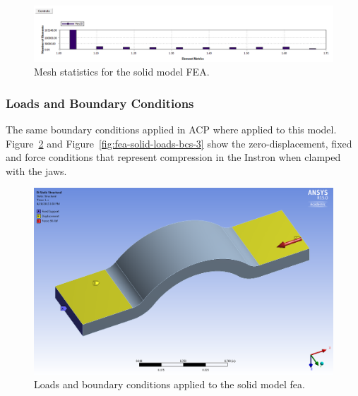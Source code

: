 \begin{figure}[htp]
\centering
\includegraphics[width=1\textwidth]{./figures/fea/fea-solid-mesh-metrics}
\caption{Mesh statistics for the solid model FEA.}
\label{fig:fea-solid-mesh-metrics}
\end{figure}

\clearpage

\subsubsection{Loads and Boundary Conditions}

\indent

The same boundary conditions applied in ACP where applied to this model. Figure~\ref{fig:fea-solid-loads-bcs} and Figure~\ref{fig:fea-solid-loads-bcs-3} show the zero-displacement, fixed and force conditions that represent compression in the Instron when clamped with the jaws.\\

\begin{figure}[htp]
\centering
\includegraphics[width=1\textwidth]{./figures/fea/fea-solid-loads-bcs}
\caption{Loads and boundary conditions applied to the solid model fea.}
\label{fig:fea-solid-loads-bcs}
\end{figure}

